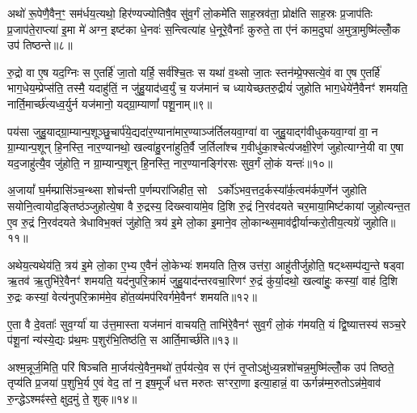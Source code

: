 अथो॑ रू॒पेणै॒वैन॒ꣳ॒ सम॑र्धय॒त्यथो॒ हिर॑ण्यज्योतिषै॒व सु॑व॒र्गं लो॒कमे॑ति साह॒स्रव॑ता॒ प्रोक्ष॑ति साह॒स्रः प्र॒जाप॑तिः प्र॒जाप॑ते॒राप्त्या॑ इ॒मा मे॑ अग्न॒ इष्ट॑का धे॒नवः॑ स॒न्त्वित्या॑ह धे॒नूरे॒वैनाः᳚ कुरुते॒ ता ए॑नं काम॒दुघा॑ अ॒मुत्रा॒मुष्मि॑ल्लोँ॒क उप॑ तिष्ठन्ते॥८॥

{\anuvakamend[{सयो॑निमे॒ता वै क॑रो॒त्येका॒न्नच॑त्वारि॒ꣳ॒शच्च॑॥२॥}]}

रु॒द्रो वा ए॒ष यद॒ग्निः स ए॒तर्\mbox{}हि॑ जा॒तो यर्\mbox{}हि॒ सर्व॑श्चि॒तः स यथा॑ व॒थ्सो जा॒तः स्तन॑म्प्रे॒फ्सत्ये॒वं वा ए॒ष ए॒तर्\mbox{}हि॑ भाग॒धेय॒म्प्रेप्स॑ति॒ तस्मै॒ यदाहु॑तिं॒ न जु॑हु॒याद॑ध्व॒र्युं च॒ यज॑मानं च ध्यायेच्छतरु॒द्रीयं॑ जुहोति भाग॒धेये॑नै॒वैनꣳ॑ शमयति॒ नार्ति॒मार्च्छ॑त्यध्व॒र्युर्न यज॑मानो॒ यद्ग्रा॒म्याणां᳚ पशू॒नाम्॥९॥

पय॑सा जुहु॒याद्ग्रा॒म्यान्प॒शूञ्छु॒चार्प॑ये॒द्यदा॑र॒ण्याना॑मार॒ण्याञ्ज॑र्तिलयवा॒ग्वा॑ वा जुहु॒याद्ग॑वीधुकयवा॒ग्वा॑ वा॒ न ग्रा॒म्यान्प॒शून् हि॒नस्ति॒ नार॒ण्यानथो॒ खल्वा॑हु॒रना॑हुति॒र्वै ज॒र्तिला᳚श्च ग॒वीधु॑का॒श्चेत्य॑जक्षी॒रेण॑ जुहोत्याग्ने॒यी वा ए॒षा यद॒जाहु॑त्यै॒व जु॑होति॒ न ग्रा॒म्यान्प॒शून् हि॒नस्ति॒ नार॒ण्यानङ्गि॑रसः सुव॒र्गं लो॒कं यन्तः॑॥१०॥

अ॒जायां᳚ घ॒र्मम्प्रासि॑ञ्च॒न्थ्सा शोच॑न्ती प॒र्णम्परा॑जिहीत॒ सो  \-ऽर्को॑\-ऽभव॒त्तद॒र्कस्या᳚र्क॒त्वम॑र्कप॒र्णेन॑ जुहोति सयोनि॒त्वायोद॒ङ्तिष्ठ॑ञ्जुहोत्ये॒षा वै रु॒द्रस्य॒ दिख्स्वाया॑मे॒व दि॒शि रु॒द्रं नि॒रव॑दयते चर॒माया॒मिष्ट॑कायां जुहोत्यन्त॒त ए॒व रु॒द्रं नि॒रव॑दयते त्रेधाविभ॒क्तं जु॑होति॒ त्रय॑ इ॒मे लो॒का इ॒माने॒व लो॒कान्थ्स॒माव॑द्वीर्यान्करो॒तीय॒त्यग्रे॑ जुहोति॥११॥

अथेय॒त्यथेय॑ति॒ त्रय॑ इ॒मे लो॒का ए॒भ्य ए॒वैनं॑ लो॒केभ्यः॑ शमयति ति॒स्र उत्त॑रा॒ आहु॑तीर्जुहोति॒ षट्थ्सम्प॑द्य॒न्ते षड्वा ऋ॒तव॑ ऋ॒तुभि॑रे॒वैनꣳ॑ शमयति॒ यद॑नुपरि॒क्रामं॑ जुहु॒याद॑न्तरवचा॒रिणꣳ॑ रु॒द्रं कु॑र्या॒दथो॒ खल्वा॑हुः॒ कस्यां॒ वाह॑ दि॒शि रु॒द्रः कस्यां॒ वेत्य॑नुपरि॒क्राम॑मे॒व हो॑त॒व्य॑मप॑रिवर्गमे॒वैनꣳ॑ शमयति॥१२॥

ए॒ता वै दे॒वताः᳚ सुव॒र्ग्या॑ या उ॑त्त॒मास्ता यज॑मानं वाचयति॒ ताभि॑रे॒वैनꣳ॑ सुव॒र्गं लो॒कं ग॑मयति॒ यं द्वि॒ष्यात्तस्य॑ सञ्च॒रे प॑शू॒नां न्य॑स्ये॒द्यः प्र॑थ॒मः प॒शुर॑भि॒तिष्ठ॑ति॒ स आर्ति॒मार्च्छ॑ति॥१३॥

{\anuvakamend[{प॒शू॒नां यन्तो\-ऽग्रे॑ जुहो॒त्यप॑रिवर्गमे॒वैनꣳ॑ शमयति त्रि॒ꣳ॒शच्च॑॥३॥}]}

अश्म॒न्नूर्ज॒मिति॒ परि॑ षिञ्चति मा॒र्जय॑त्ये॒वैन॒मथो॑ त॒र्पय॑त्ये॒व स ए॑नं तृ॒प्तो\-ऽक्षु॑ध्य॒न्नशो॑चन्न॒मुष्मि॑ल्लोँ॒क उप॑ तिष्ठते॒ तृप्य॑ति प्र॒जया॑ प॒शुभि॒र्य ए॒वं वेद॒ तां न॒ इष॒मूर्जं॑ धत्त मरुतः सꣳररा॒णा इत्या॒हान्नं॒ वा ऊर्गन्न॑म्म॒रुतो\-ऽन्न॑मे॒वाव॑ रु॒न्द्धे\-ऽश्मꣴ॑स्ते॒ क्षुद॒मुं ते॒ शुक्॥१४॥

